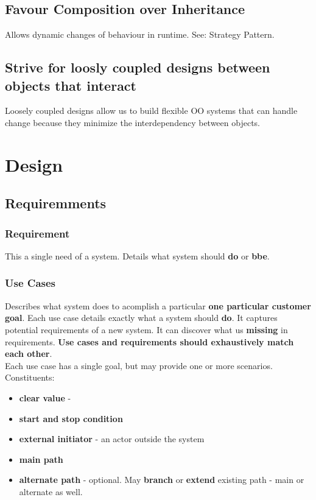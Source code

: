 \documentclass{report}
\begin{document}
\chapter{Favour Composition over Inheritance}
Allows dynamic changes of behaviour in runtime. See: Strategy Pattern.



\chapter{Strive for loosly coupled designs between objects that interact}
Loosely coupled designs allow us to build flexible OO systems that can handle change 
because they minimize the interdependency between objects.




\part{Design}



\chapter{Requiremments}


\section{Requirement}
This a single need of a system. Details what system should \textbf{do} or
\textbf{bbe}.


\section{Use Cases}
Describes what system does to acomplish a particular \textbf{one particular 
customer goal}. Each use case details exactly what a system should \textbf{do}.
It captures potential requirements of a new system. It can discover what us
\textbf{missing} in requirements. \textbf{Use cases and requirements should exhaustively match each other}.\\
Each use case has a single goal, but may provide one or more scenarios. Constituents:
\begin{itemize}
  \item \textbf{clear value} - 
  \item \textbf{start and stop condition}
  \item \textbf{external initiator} - an actor outside the system
  \item \textbf{main path}
  \item \textbf{alternate path} - optional. May \textbf{branch} or \textbf{extend} 
  existing path - main or alternate as well.
\end{itemize}
\end{document}
